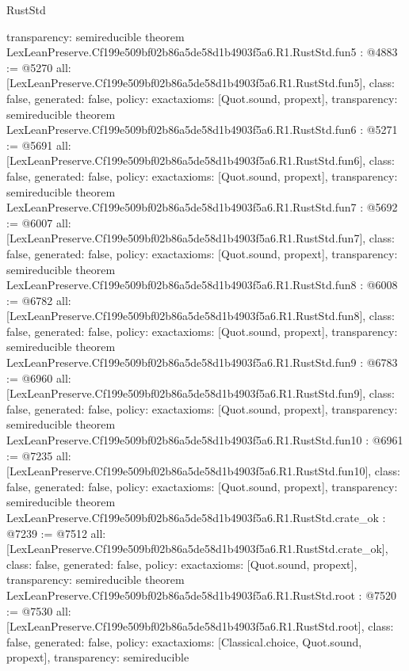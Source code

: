 \begin{lexlean}{RustStd}
\begin{coremodule}
{  transparency: semireducible
}
theorem LexLeanPreserve.Cf199e509bf02b86a5de58d1b4903f5a6.R1.RustStd.fun5 : @4883 := @5270 {
  all: [LexLeanPreserve.Cf199e509bf02b86a5de58d1b4903f5a6.R1.RustStd.fun5],
  class: false,
  generated: false,
  policy: exact{axioms: [Quot.sound, propext]},
  transparency: semireducible
}
theorem LexLeanPreserve.Cf199e509bf02b86a5de58d1b4903f5a6.R1.RustStd.fun6 : @5271 := @5691 {
  all: [LexLeanPreserve.Cf199e509bf02b86a5de58d1b4903f5a6.R1.RustStd.fun6],
  class: false,
  generated: false,
  policy: exact{axioms: [Quot.sound, propext]},
  transparency: semireducible
}
theorem LexLeanPreserve.Cf199e509bf02b86a5de58d1b4903f5a6.R1.RustStd.fun7 : @5692 := @6007 {
  all: [LexLeanPreserve.Cf199e509bf02b86a5de58d1b4903f5a6.R1.RustStd.fun7],
  class: false,
  generated: false,
  policy: exact{axioms: [Quot.sound, propext]},
  transparency: semireducible
}
theorem LexLeanPreserve.Cf199e509bf02b86a5de58d1b4903f5a6.R1.RustStd.fun8 : @6008 := @6782 {
  all: [LexLeanPreserve.Cf199e509bf02b86a5de58d1b4903f5a6.R1.RustStd.fun8],
  class: false,
  generated: false,
  policy: exact{axioms: [Quot.sound, propext]},
  transparency: semireducible
}
theorem LexLeanPreserve.Cf199e509bf02b86a5de58d1b4903f5a6.R1.RustStd.fun9 : @6783 := @6960 {
  all: [LexLeanPreserve.Cf199e509bf02b86a5de58d1b4903f5a6.R1.RustStd.fun9],
  class: false,
  generated: false,
  policy: exact{axioms: [Quot.sound, propext]},
  transparency: semireducible
}
theorem LexLeanPreserve.Cf199e509bf02b86a5de58d1b4903f5a6.R1.RustStd.fun10 : @6961 := @7235 {
  all: [LexLeanPreserve.Cf199e509bf02b86a5de58d1b4903f5a6.R1.RustStd.fun10],
  class: false,
  generated: false,
  policy: exact{axioms: [Quot.sound, propext]},
  transparency: semireducible
}
theorem LexLeanPreserve.Cf199e509bf02b86a5de58d1b4903f5a6.R1.RustStd.crate_ok : @7239 := @7512 {
  all: [LexLeanPreserve.Cf199e509bf02b86a5de58d1b4903f5a6.R1.RustStd.crate_ok],
  class: false,
  generated: false,
  policy: exact{axioms: [Quot.sound, propext]},
  transparency: semireducible
}
theorem LexLeanPreserve.Cf199e509bf02b86a5de58d1b4903f5a6.R1.RustStd.root : @7520 := @7530 {
  all: [LexLeanPreserve.Cf199e509bf02b86a5de58d1b4903f5a6.R1.RustStd.root],
  class: false,
  generated: false,
  policy: exact{axioms: [Classical.choice, Quot.sound, propext]},
  transparency: semireducible
}


\end{coremodule}
\end{lexlean}
